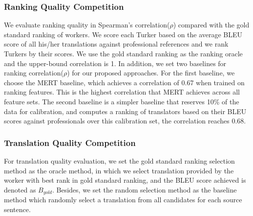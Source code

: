 \documentclass[11pt,letterpaper]{article}
\begin{document}
\subsubsection{Ranking Quality Competition}
We evaluate ranking quality in Spearman's correlation($\rho$) compared with the gold standard ranking of workers. We score each Turker based on the average BLEU score of all his/her translations against professional references and we rank Turkers by their scores. We use the gold standard ranking as the ranking oracle and the upper-bound correlation is 1. In addition, we set two baselines for ranking correlation($\rho$) for our proposed approaches. For the first baseline,  we choose the MERT\cite{och2003minimum} baseline, which achieves a correlation of  0.67 when trained on ranking features. This is the highest correlation that  MERT achieves across all feature sets. The second baseline is a simpler baseline that reserves 10\% of the data for calibration, and computes a ranking of translators based on their BLEU scores against professionals over this calibration set, the correlation reaches 0.68.  
\subsubsection{Translation Quality Competition} 
For translation quality evaluation, we set the gold standard ranking selection method as the oracle method, in which we select translation provided by the worker with best rank in gold standard ranking, and the BLEU score achieved is denoted as $B_{gold}$.
Besides, we set the random selection method as the baseline method which randomly select a translation from all candidates for each source sentence. 
\end{document}
